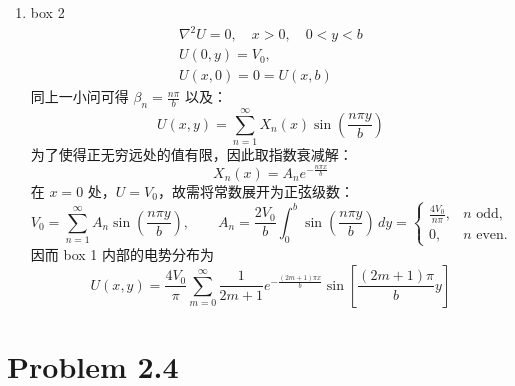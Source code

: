 \documentclass[a4paper]{article}
\begin{document}
\begin{enumerate}
\begin{equation*}
\begin{cases}
            \end{cases}
        \end{equation*}
        因而 box 1 内部的电势分布为
        \begin{equation*}
            U(x,y)=\frac{4V_0}{\pi}\sum_{m=0}^{\infty}\frac{1}{2m+1}
            \frac{\cosh\!\left(\dfrac{(2m+1)\pi x}{b}\right)}
                {\cosh\!\left(\dfrac{(2m+1)\pi a}{2b}\right)}
            \sin\!\left[\frac{(2m+1)\pi}{b}\left(y+\frac b2\right)\right]
        \end{equation*}
    \item[(b)] box 2
        \begin{gather*}
            \nabla^2 U = 0, \quad x>0, \quad 0 < y < b \\
            U\left(0, y\right) = V_0,\\
            U\left(x, 0\right) = 0 = U\left(x, b\right)
        \end{gather*}
        同上一小问可得 $\beta_n = \frac{n\pi}{b}$ 以及：
        \begin{equation*}
            U(x,y)=\sum_{n=1}^{\infty}X_n(x)
            \sin\!\left(\frac{n\pi y}{b}\right)
        \end{equation*}
        为了使得正无穷远处的值有限，因此取指数衰减解：
        \begin{equation*}
            X_n(x)=A_n e^{-\frac{n\pi x}{b}}
        \end{equation*}
        在 $x=0$ 处，$U=V_0$，故需将常数展开为正弦级数：
        \begin{equation*}
            V_0=\sum_{n=1}^{\infty}A_n
            \sin\!\left(\frac{n\pi y}{b}\right),\qquad
            A_n=\frac{2V_0}{b}\int_0^b\sin\!\left(\frac{n\pi y}{b}\right)\,dy
            =\begin{cases}\displaystyle \frac{4V_0}{n\pi},&n\text{ odd},\\[4pt]0,&n\text{ even}.
            \end{cases}
        \end{equation*}
        因而 box 1 内部的电势分布为
        \begin{equation*}
            U(x,y)=\frac{4V_0}{\pi}\sum_{m=0}^{\infty}\frac{1}{2m+1}
            e^{-\frac{(2m+1)\pi x}{b}}
            \sin\!\left[\frac{(2m+1)\pi}{b}y\right]
        \end{equation*}
    \end{enumerate}

    \section*{Problem 2.4}
\end{document}
